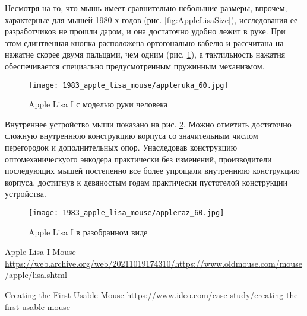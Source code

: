 \documentclass[11pt, a4paper]{article}
\begin{document}
Несмотря на то, что мышь имеет сравнительно небольшие размеры, впрочем, характерные для мышей 1980-х годов (рис. \ref{fig:AppleLisaSize}), исследования ее разработчиков не прошли даром, и она достаточно удобно лежит в руке. При этом единтвенная кнопка расположена ортогонально кабелю и рассчитана на нажатие скорее двумя пальцами, чем одним (рис. \ref{fig:AppleLisaHand}), а тактильность нажатия обеспечивается специально предусмотренным пружинным механизмом.

\begin{figure}[h]
    \centering
    \texttt{[image: 1983\_apple\_lisa\_mouse/appleruka\_60.jpg]}
    \caption{Apple Lisa I с моделью руки человека}
    \label{fig:AppleLisaHand}
\end{figure}

Внутреннее устройство мыши показано на рис. \ref{fig:AppleLisaInside}. Можно отметить достаточно сложную внутреннюю конструкцию корпуса со значительным числом перегородок и дополнительных опор. Унаследовав конструкцию оптомеханическуого энкодера практически без изменений, производители последующих мышей постепенно все более упрощали внутреннюю конструкцию корпуса, достигнув к девяностым годам практически пустотелой конструкции устройства.

 \begin{figure}[h]
    \centering
    \texttt{[image: 1983\_apple\_lisa\_mouse/appleraz\_60.jpg]}
    \caption{Apple Lisa I в разобранном виде}
    \label{fig:AppleLisaInside}
\end{figure}

\begin{thebibliography}{9}
 Apple Lisa I Mouse \url{https://web.archive.org/web/20211019174310/https://www.oldmouse.com/mouse/apple/lisa.shtml}

 Creating the First Usable Mouse \url{https://www.ideo.com/case-study/creating-the-first-usable-mouse}
\end{thebibliography}
\end{document}
